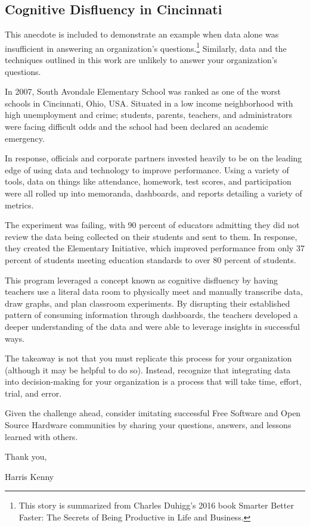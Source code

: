 \subsection{Cognitive Disfluency in Cincinnati}
This anecdote is included to demonstrate an example when data alone was insufficient in answering an organization's questions.\footnote{This story is summarized from Charles Duhigg's 2016 book Smarter Better Faster: The Secrets of Being Productive in Life and Business.} Similarly, data and the techniques outlined in this work are unlikely to answer your organization's questions.

In 2007, South Avondale Elementary School was ranked as one of the worst schools in Cincinnati, Ohio, USA. Situated in a low income neighborhood with high unemployment and crime; students, parents, teachers, and administrators were facing difficult odds and the school had been declared an academic emergency. 

In response, officials and corporate partners invested heavily to be on the leading edge of using data and technology to improve performance. Using a variety of tools, data on things like attendance, homework, test scores, and participation were all rolled up into memoranda, dashboards, and reports detailing a variety of metrics.

The experiment was failing, with 90 percent of educators admitting they did not review the data being collected on their students and sent to them. In response, they created the Elementary Initiative, which improved performance from only 37 percent of students meeting education standards to over 80 percent of students.

This program leveraged a concept known as cognitive disfluency by having teachers use a literal data room to physically meet and manually transcribe data, draw graphs, and plan classroom experiments. By disrupting their established pattern of consuming information through dashboards, the teachers developed a deeper understanding of the data and were able to leverage insights in successful ways.

The takeaway is not that you must replicate this process for your organization (although it may be helpful to do so). Instead, recognize that integrating data into decision-making for your organization is a process that will take time, effort, trial, and error.

Given the challenge ahead, consider imitating successful Free Software and Open Source Hardware communities by sharing your questions, answers, and lessons learned with others.

Thank you,

Harris Kenny